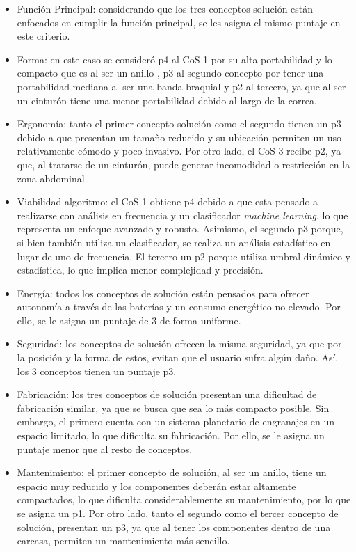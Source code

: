     \begin{itemize}
    \item Función Principal: considerando que los tres conceptos solución están enfocados en cumplir la función principal, se les asigna el mismo puntaje en este criterio.
    \item Forma: en este caso se consideró p4 al \ac{CoS}-1 por su alta portabilidad y lo compacto que es al ser un anillo , p3 al segundo concepto por tener una portabilidad mediana al ser una banda braquial y p2 al tercero, ya que al ser un cinturón tiene una menor portabilidad debido al largo de la correa.
    \item Ergonomía: tanto el primer concepto solución como el segundo tienen un p3 debido a que presentan un tamaño reducido y su ubicación permiten un uso relativamente cómodo y poco invasivo. Por otro lado, el \ac{CoS}-3 recibe p2, ya que, al tratarse de un cinturón, puede generar incomodidad o restricción en la zona abdominal.
    \item Viabilidad algoritmo: el \ac{CoS}-1 obtiene p4 debido a que esta pensado a realizarse con análisis en frecuencia y un clasificador \textit{machine learning}, lo que representa un enfoque avanzado y robusto. Asimismo, el segundo p3 porque, si bien también utiliza un clasificador, se realiza un análisis estadístico en lugar de uno de frecuencia. El tercero un p2 porque utiliza umbral dinámico y estadística, lo que implica menor complejidad y precisión.
    \item Energía: todos los conceptos de solución están pensados para ofrecer autonomía a través de las baterías y un consumo energético no elevado. Por ello, se le asigna un puntaje de 3 de forma uniforme.
    \item Seguridad: los conceptos de solución ofrecen la misma seguridad, ya que por la posición y la forma de estos, evitan que el usuario sufra algún daño. Así, los 3 conceptos tienen un puntaje p3.
    \item Fabricación: los tres conceptos de solución presentan una dificultad de fabricación similar, ya que se busca que sea lo más compacto posible. Sin embargo, el primero cuenta con un sistema planetario de engranajes en un espacio limitado, lo que dificulta su fabricación. Por ello, se le asigna un puntaje menor que al resto de conceptos.
    \item Mantenimiento: el primer concepto de solución, al ser un anillo, tiene un espacio muy reducido y los componentes deberán estar altamente compactados, lo que dificulta considerablemente su mantenimiento, por lo que se asigna un p1. Por otro lado, tanto el segundo como el tercer concepto de solución, presentan un p3, ya que al tener los componentes dentro de una carcasa, permiten un mantenimiento más sencillo.
    \end{itemize}


